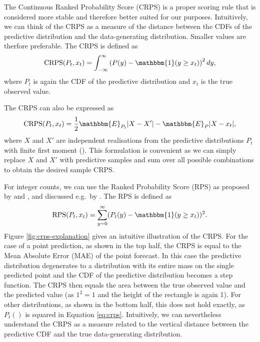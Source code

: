 \documentclass[
]{book}
\renewcommand{\mathbb}{\mathbbm}
\begin{document}
The Continuous Ranked Probability Score (CRPS) \citep{mathesonScoringRulesContinuous1976, gneitingStrictlyProperScoring2007} is a proper scoring rule that is considered more stable and therefore better suited for our purposes. Intuitively, we can think of the CRPS as a measure of the distance between the CDFs of the predictive distribution and the data-generating distribution. Smaller values are therfore preferable. The CRPS is defined as
\begin{equation}
\label{eq:crps}
\text{CRPS}(P_t, x_t) = \int_{-\infty}^\infty \left( P(y) - \mathbb{1}(y \geq x_t) \right)^2 dy,
\end{equation}
where \(P_t\) is again the CDF of the predictive distribution and \(x_t\) is the true observed value.

The CRPS can also be expressed as
\[ \text{CRPS}(P_t, x_t) = \frac{1}{2} \mathbb{E}_{P_t} |X - X'| - \mathbb{E}_P |X - x_t|, \]
where \(X\) and \(X'\) are independent realisations from the predictive distributions \(P_t\) with finite first moment (\citet{gneitingStrictlyProperScoring2007}). This formulation is convenient as we can simply replace \(X\) and \(X'\) with predictive samples and sum over all possible combinations to obtain the desired sample CRPS.

For integer counts, we can use the Ranked Probability Score (RPS) as proposed by \citet{epsteinScoringSystemProbability1969} and \citet{murphyRankedProbabilityScore1969}, and discussed e.g.~by \citet{czadoPredictiveModelAssessment2009}. The RPS is defined as
\[ \text{RPS}(P_t, x_t) = \sum_{y = 0}^\infty (P_t(y) - \mathbb{1} (y \geq x_t))^2. \]
Figure \ref{fig:crps-explanation} gives an intuitive illustration of the CRPS. For the case of a point prediction, as shown in the top half, the CRPS is equal to the Mean Absolute Error (MAE) of the point forecast. In this case the predictive distribution degenerates to a distribution with its entire mass on the single predicted point and the CDF of the predictive distribution becomes a step function. The CRPS then equals the area between the true observed value and the predicted value (as \(1^2 = 1\) and the height of the rectangle is again 1). For other distributions, as shown in the bottom half, this does not hold exactly, as \(P_t()\) is squared in Equation \eqref{eq:crps}. Intuitively, we can nevertheless understand the CRPS as a measure related to the vertical distance between the predictive CDF and the true data-generating distribution.
\end{document}
